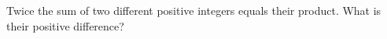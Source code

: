 Twice the sum of two different positive integers equals their product. What is their positive difference?
